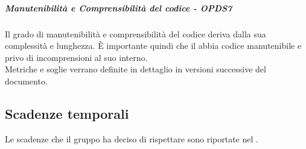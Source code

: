 \documentclass[PianoDiQualifica.tex]{subfiles}
\begin{document}
				\subparagraph{Manutenibilità e Comprensibilità del codice - OPDS7}
				Il grado di manutenibilità e comprensibilità del codice deriva dalla sua complessità e lunghezza. È importante quindi che il  abbia codice manutenibile e
				privo di incomprensioni al suo interno. \\
				Metriche e soglie verrano definite in dettaglio in versioni successive del documento.

		\subsection{Scadenze temporali}
		Le scadenze che il gruppo \GRUPPO{} ha deciso di rispettare sono riportate nel \PPdocRR{}.
\end{document}
